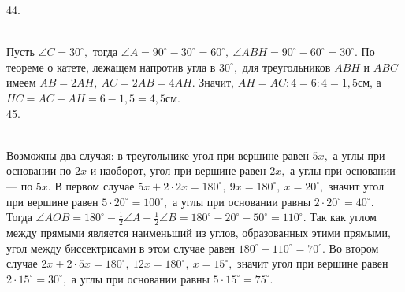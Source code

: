 \documentclass[12pt]{article}
\begin{document}
44. \begin{figure}[ht!]
\end{figure}\\
Пусть $\angle C=30^\circ,$ тогда $\angle A=90^\circ-30^\circ=60^\circ,\ \angle ABH=90^\circ-60^\circ=30^\circ.$ По теореме о катете, лежащем напротив угла в $30^\circ,$ для треугольников $ABH$ и $ABC$ имеем $AB=2AH,\ AC=2AB=4AH.$ Значит, $AH=AC:4=6:4=1,5$см, а $HC=AC-AH=6-1,5=4,5$см.\\
45. \begin{figure}[ht!]
\end{figure}\\
Возможны два случая: в треугольнике угол при вершине равен $5x,$ а углы при основании по $2x$ и наоборот, угол при вершине равен $2x,$ а углы при основании --- по $5x.$ В первом случае $5x+2\cdot2x=180^\circ,\ 9x=180^\circ,\ x=20^\circ,$ значит угол при вершине равен $5\cdot20^\circ=100^\circ,$ а углы при основании равны $2\cdot20^\circ=40^\circ.$ Тогда $\angle AOB=180^\circ-\frac{1}{2}\angle A-\frac{1}{2}\angle B=180^\circ-20^\circ-50^\circ=110^\circ.$ Так как углом между прямыми является наименьший из углов, образованных этими прямыми, угол между биссектрисами в этом случае равен $180^\circ-110^\circ=70^\circ.$ Во втором случае $2x+2\cdot5x=180^\circ,\ 12x=180^\circ,\ x=15^\circ,$ значит угол при вершине равен $2\cdot15^\circ=30^\circ,$ а углы при основании равны $5\cdot15^\circ=75^\circ.$
\end{document}
